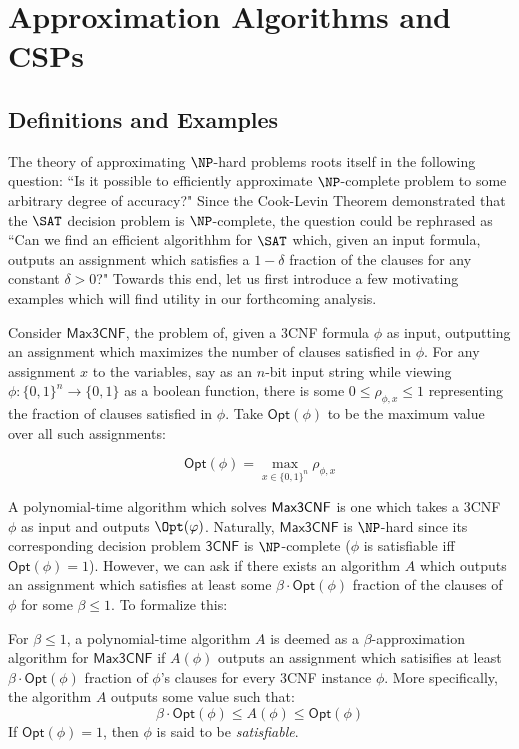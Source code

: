 \section{Approximation Algorithms and CSPs}
\subsection{Definitions and Examples}
The theory of approximating $\NP$-hard problems roots itself in the following question: ``Is it possible to efficiently approximate $\NP$-complete problem to some arbitrary degree of accuracy?" Since the Cook-Levin Theorem demonstrated that the $\SAT$ decision problem is $\NP$-complete, the question could be rephrased as ``Can we find an efficient algorithhm for $\SAT$ which, given an input formula, outputs an assignment which satisfies a $1-\delta$ fraction of the clauses for any constant $\delta >  0$?" Towards this end, let us first introduce a few motivating examples which will find utility in our forthcoming analysis. \newline

Consider $\mathsf{Max3CNF}$, the problem of, given a 3CNF formula $\phi$ as input, outputting an assignment which maximizes the number of clauses satisfied in $\phi$. For any assignment $x$ to the variables, say as an $n$-bit input string while viewing $\phi:\{0,1\}^n \rightarrow \{0,1\}$ as a boolean function, there is some $0 \leq \rho_{\phi,x} \leq 1$ representing the fraction of clauses satisfied in $\phi$. Take $\mathsf{Opt}(\phi)$ to be the maximum value over all such assignments:

\[ \mathsf{Opt}(\phi) = \max_{x \in \{0,1\}^n}\rho_{\phi,x} \]

A polynomial-time algorithm which solves $\mathsf{Max3CNF}$ is one which takes a 3CNF $\phi$ as input and outputs $\Opt(\phi)$. Naturally, $\mathsf{Max3CNF}$ is $\NP$-hard since its corresponding decision problem $\mathsf{3CNF}$ is $\NP$-complete ($\phi$ is satisfiable iff $\mathsf{Opt}(\phi) = 1$).
%
However, we can ask if there exists an algorithm $A$ which outputs an assignment which satisfies at least some $\beta\cdot\mathsf{Opt}(\phi)$ fraction of the clauses of $\phi$ for some $\beta \leq 1$. To formalize this: \newline
%
\begin{definition} \label{Opt3SATDef}
For $\beta \leq 1$, a polynomial-time algorithm $A$ is deemed as a $\beta$-approximation algorithm for $\mathsf{Max3CNF}$ if $A(\phi)$ outputs an assignment which satisifies at least $\beta\cdot\mathsf{Opt}(\phi)$ fraction of $\phi$'s clauses for every 3CNF instance $\phi$. More specifically, the algorithm $A$ outputs some value such that:
\begin{equation}
  \beta\cdot\mathsf{Opt}(\phi) \leq A(\phi) \leq \mathsf{Opt}(\phi)
\end{equation}
If $\mathsf{Opt}(\phi) = 1$, then $\phi$ is said to be \emph{satisfiable}.
\end{definition}

